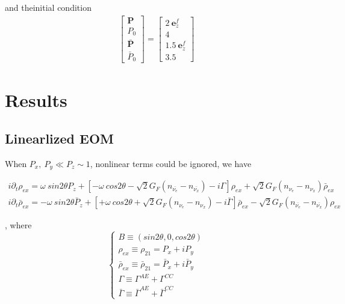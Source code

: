 \documentclass[aps,prd,twocolumn,amsmath,amssymb,groupedaddress]{revtex4-2}
\begin{document}
and theinitial condition
\begin{eqnarray}
\begin{bmatrix}
	\textbf{P} \\ P_0 \\ \bar{\textbf{P}} \\ \bar{P}_0
\end{bmatrix}
= \begin{bmatrix}
	2 ~\textbf{e}_z^f\\ 4 \\ 1.5 ~\textbf{e}_z^f \\ 3.5
\end{bmatrix}
\end{eqnarray}

\section{\label{sec:results} Results}

\subsection{\label{subsec:linear} Linearlized EOM}
When $P_x, ~P_y \ll P_z \sim 1$, nonlinear terms could be ignored, we have
\begin{widetext}
\begin{eqnarray}
	i \partial_t \rho_{ex} = \omega ~sin2\theta P_{z}
	+\left[-\omega ~cos2\theta-\sqrt{2}G_F(n_{\bar{\nu_e}}-n_{\bar{\nu_x}})- i \Gamma \right]\rho_{ex} + \sqrt{2}G_F(n_{\nu_e}-n_{\nu_x}) \bar{\rho}_{ex}\\
	i \partial_t \bar{\rho}_{ex} = - \omega ~sin2\theta \bar{P}_{z} +\left[+\omega ~cos2\theta + \sqrt{2}G_F(n_{\nu_e}-n_{\nu_x}) - i \bar{\Gamma} \right]\bar{\rho}_{ex} -\sqrt{2}G_F(n_{\bar{\nu_e}}-n_{\bar{\nu_x}}) \rho_{ex}
\end{eqnarray}
\end{widetext}
,
where
\begin{equation}
\begin{cases}
	B \equiv (sin 2\theta,0 ,cos 2\theta)
	\\
	\rho_{ex} \equiv \rho_{21} = P_x+i P_y
	\\
	\bar{\rho}_{ex} \equiv \bar{\rho}_{21} = \bar{P}_x+i \bar{P}_y
	\\
	\Gamma \equiv \Gamma^{AE} + \Gamma^{CC}
	\\
	\bar{\Gamma} \equiv \bar{\Gamma}^{AE} + \bar{\Gamma}^{CC}
\end{cases}
\end{equation}
\end{document}
